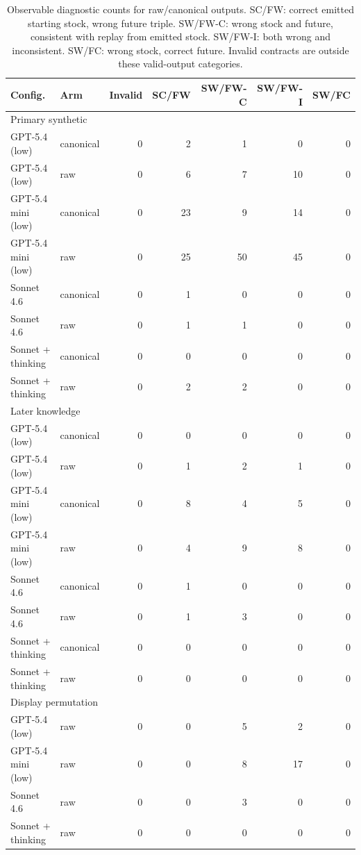 \begin{table}[t]
\centering\small
\caption{Observable diagnostic counts for raw/canonical outputs. SC/FW: correct emitted starting stock, wrong future triple. SW/FW-C: wrong stock and future, consistent with replay from emitted stock. SW/FW-I: both wrong and inconsistent. SW/FC: wrong stock, correct future. Invalid contracts are outside these valid-output categories.}
\label{tab:diagnostic}
\begin{tabular}{llrrrrr}
\toprule
Config. & Arm & Invalid & SC/FW & SW/FW-C & SW/FW-I & SW/FC \\
\midrule
\multicolumn{7}{l}{Primary synthetic} \\
GPT-5.4 (low) & canonical & 0 & 2 & 1 & 0 & 0 \\
GPT-5.4 (low) & raw & 0 & 6 & 7 & 10 & 0 \\
GPT-5.4 mini (low) & canonical & 0 & 23 & 9 & 14 & 0 \\
GPT-5.4 mini (low) & raw & 0 & 25 & 50 & 45 & 0 \\
Sonnet 4.6 & canonical & 0 & 1 & 0 & 0 & 0 \\
Sonnet 4.6 & raw & 0 & 1 & 1 & 0 & 0 \\
Sonnet + thinking & canonical & 0 & 0 & 0 & 0 & 0 \\
Sonnet + thinking & raw & 0 & 2 & 2 & 0 & 0 \\
\multicolumn{7}{l}{Later knowledge} \\
GPT-5.4 (low) & canonical & 0 & 0 & 0 & 0 & 0 \\
GPT-5.4 (low) & raw & 0 & 1 & 2 & 1 & 0 \\
GPT-5.4 mini (low) & canonical & 0 & 8 & 4 & 5 & 0 \\
GPT-5.4 mini (low) & raw & 0 & 4 & 9 & 8 & 0 \\
Sonnet 4.6 & canonical & 0 & 1 & 0 & 0 & 0 \\
Sonnet 4.6 & raw & 0 & 1 & 3 & 0 & 0 \\
Sonnet + thinking & canonical & 0 & 0 & 0 & 0 & 0 \\
Sonnet + thinking & raw & 0 & 0 & 0 & 0 & 0 \\
\multicolumn{7}{l}{Display permutation} \\
GPT-5.4 (low) & raw & 0 & 0 & 5 & 2 & 0 \\
GPT-5.4 mini (low) & raw & 0 & 0 & 8 & 17 & 0 \\
Sonnet 4.6 & raw & 0 & 0 & 3 & 0 & 0 \\
Sonnet + thinking & raw & 0 & 0 & 0 & 0 & 0 \\

\end{tabular}
\end{table}
